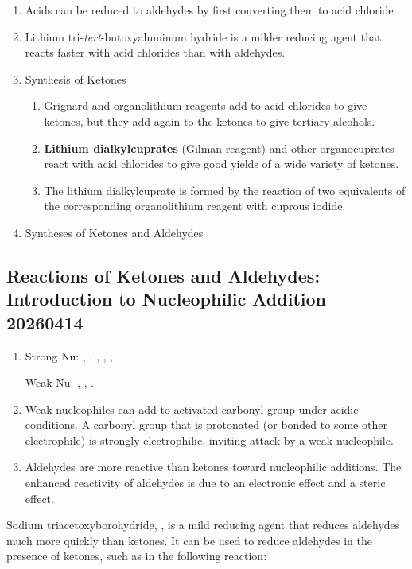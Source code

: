 \begin{enumerate}
    \item Acids can be reduced to aldehydes by first converting them to acid chloride.
    \item Lithium tri-\textit{tert}-butoxyaluminum hydride is a milder reducing agent that reacts faster with acid chlorides than with aldehydes.
    \item Synthesis of Ketones
    \begin{enumerate}
        \item Grignard and organolithium reagents add to acid chlorides to give ketones, but they add again to the ketones to give tertiary alcohols.
        \item \textbf{Lithium dialkylcuprates} (Gilman reagent) and other organocuprates react with acid chlorides to give good yields of a wide variety of ketones.
        \item The lithium dialkylcuprate is formed by the reaction of two equivalents of the corresponding organolithium reagent with cuprous iodide.
    \end{enumerate}
    \item Syntheses of Ketones and Aldehydes %
\end{enumerate}

\subsection{Reactions of Ketones and Aldehydes: Introduction to Nucleophilic Addition 20260414}

\begin{enumerate}
    \item Strong Nu: , , , , , 
    
    Weak Nu: , , .
    \item Weak nucleophiles can add to activated carbonyl group under acidic conditions. A carbonyl group that is protonated (or bonded to some other electrophile) is strongly electrophilic, inviting attack by a weak nucleophile.
    \item Aldehydes are more reactive than ketones toward nucleophilic additions. The enhanced reactivity of aldehydes is due to an electronic effect and a steric effect.
\end{enumerate}

\begin{example} %
    Sodium triacetoxyborohydride, , is a mild reducing agent that reduces aldehydes much more quickly than ketones. It can be used to reduce aldehydes in the presence of ketones, such as in the following reaction: %
\end{example}

